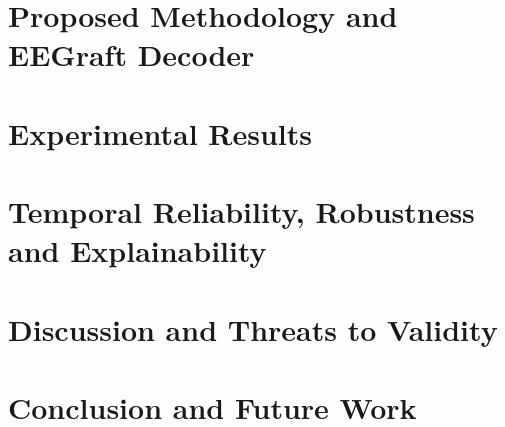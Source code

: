 \documentclass[12pt]{report}
\let\cleardoublepage\clearpage
\begin{document}
\chapter{Proposed Methodology and EEGraft Decoder}
\chapter{Experimental Results}
\chapter{Temporal Reliability, Robustness and Explainability}
\chapter{Discussion and Threats to Validity}
\chapter{Conclusion and Future Work}
\cleardoublepage{}
\printbibliography[heading=bibintoc,title={Bibliography}]
\appendix


\end{document}
